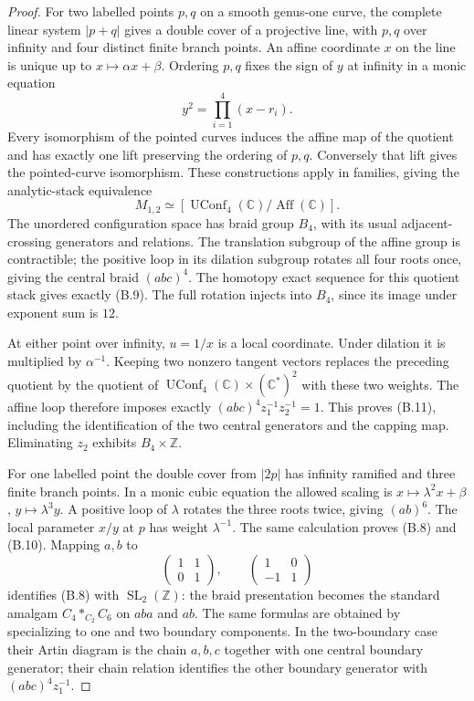 \begin{proof}
For two labelled points $p,q$ on a smooth genus-one curve, the
complete linear system $|p+q|$ gives a double cover of a projective
line, with $p,q$ over infinity and four distinct finite branch
points.  An affine coordinate $x$ on the line is unique up to
$x\mapsto\alpha x+\beta$.  Ordering $p,q$ fixes the sign of $y$
at infinity in a monic equation
\[
 y^2=\prod_{i=1}^4(x-r_i).
\]
Every isomorphism of the pointed curves induces the affine map of
the quotient and has exactly one lift preserving the ordering of
$p,q$.  Conversely that lift gives the pointed-curve isomorphism.
These constructions apply in families, giving the analytic-stack
equivalence
\[
 M_{1,2}\simeq[\operatorname{UConf}_4(\mathbb C)/
                        \operatorname{Aff}(\mathbb C)].
\]
The unordered configuration space has braid group $B_4$, with its
usual adjacent-crossing generators and relations.  The translation
subgroup of the affine group is contractible; the positive loop in
its dilation subgroup rotates all four roots once, giving the
central braid $(abc)^4$.  The homotopy exact sequence for this
quotient stack gives exactly (B.9).  The full rotation injects into
$B_4$, since its image under exponent sum is $12$.

At either point over infinity, $u=1/x$ is a local coordinate.
Under dilation it is multiplied by $\alpha^{-1}$.  Keeping two
nonzero tangent vectors replaces the preceding quotient by the
quotient of $\operatorname{UConf}_4(\mathbb C)\times(\mathbb C^*)^2$
with these two weights.  The affine loop therefore imposes exactly
$(abc)^4z_1^{-1}z_2^{-1}=1$.  This proves (B.11), including the
identification of the two central generators and the capping map.
Eliminating $z_2$ exhibits $B_4\times\mathbb Z$.

For one labelled point the double cover from $|2p|$ has infinity
ramified and three finite branch points.  In a monic cubic equation
the allowed scaling is $x\mapsto\lambda^2x+\beta$,
$y\mapsto\lambda^3y$.  A positive loop of $\lambda$ rotates the
three roots twice, giving $(ab)^6$.  The local parameter $x/y$ at
$p$ has weight $\lambda^{-1}$.  The same calculation proves
(B.8) and (B.10).  Mapping $a,b$ to
\[
 \begin{pmatrix}1&1\\0&1\end{pmatrix},\qquad
 \begin{pmatrix}1&0\\-1&1\end{pmatrix}
\]
identifies (B.8) with $\operatorname{SL}_2(\mathbb Z)$: the braid
presentation becomes the standard amalgam
$C_4*_{C_2}C_6$ on $aba$ and $ab$.
The same formulas are obtained by specializing
\citet[Theorem 3.1 and Proposition 2.12]{B_LabruereParis} to
one and two boundary components.  In the two-boundary case their
Artin diagram is the chain $a,b,c$ together with one central
boundary generator; their chain relation identifies the other
boundary generator with $(abc)^4z_1^{-1}$.
\end{proof}

